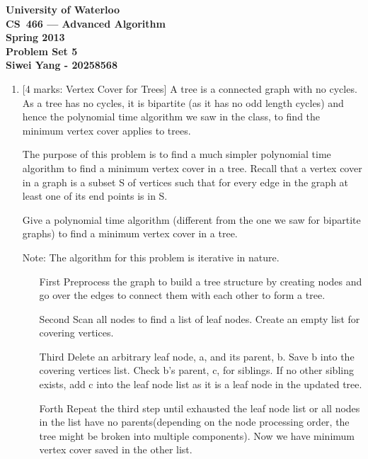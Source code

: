 \documentclass[12pt]{article}
\begin{document}
\begin{center}
\large\bf University of Waterloo\\
CS~466 --- Advanced Algorithm\\
Spring 2013\\
Problem Set 5\\
Siwei Yang - 20258568\\
\end{center}
\bigskip

\begin{enumerate}

\item{} [4 marks: Vertex Cover for Trees]
A tree is a connected graph with no cycles. As a tree has no cycles, it is bipartite (as it has no odd length cycles) and hence the polynomial time algorithm we saw in the class, to find the minimum vertex cover applies to trees.

The purpose of this problem is to find a much simpler polynomial time algorithm to find a minimum vertex cover in a tree. Recall that a vertex cover in a graph is a subset S of vertices such that for every edge in the graph at least one of its end points is in S.

Give a polynomial time algorithm (different from the one we saw for bipartite graphs) to find a minimum vertex cover in a tree.

Note: The algorithm for this problem is iterative in nature.
\begin{itemize}
\item[First]
Preprocess the graph to build a tree structure by creating nodes and go over the edges to connect them with each other to form a tree.

\item[Second]
Scan all nodes to find a list of leaf nodes. Create an empty list for covering vertices.

\item[Third]
Delete an arbitrary leaf node, a, and its parent, b. Save b into the covering vertices list. Check b's parent, c, for siblings. If no other sibling exists, add c into the leaf node list as it is a leaf node in the updated tree.

\item[Forth]
Repeat the third step until exhausted the leaf node list or all nodes in the list have no parents(depending on the node processing order, the tree might be broken into multiple components). Now we have minimum vertex cover saved in the other list.

\end{itemize}


\end{enumerate}
\end{document}
